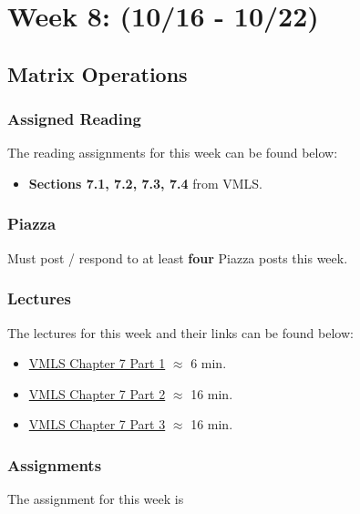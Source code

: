 \clearpage
\chapter{Week 8: (10/16 - 10/22)}

\section{Matrix Operations}

\subsection{Assigned Reading}

The reading assignments for this week can be found below:

\begin{itemize}
    \item \textbf{Sections 7.1, 7.2, 7.3, 7.4} from VMLS.
\end{itemize}

\subsection{Piazza}

Must post / respond to at least \textbf{four} Piazza posts this week.  

\subsection{Lectures}

The lectures for this week and their links can be found below:

\begin{itemize}
    \item \href{https://www.youtube.com/watch?v=jXN50fuRSqE}{VMLS Chapter 7 Part 1} $\approx$ 6 min.
    \item \href{https://www.youtube.com/watch?v=v7CH2ry-vrQ}{VMLS Chapter 7 Part 2} $\approx$ 16 min.
    \item \href{https://www.youtube.com/watch?v=kTg0vKppOl8}{VMLS Chapter 7 Part 3} $\approx$ 16 min.
\end{itemize}

\subsection{Assignments}

The assignment for this week is   

